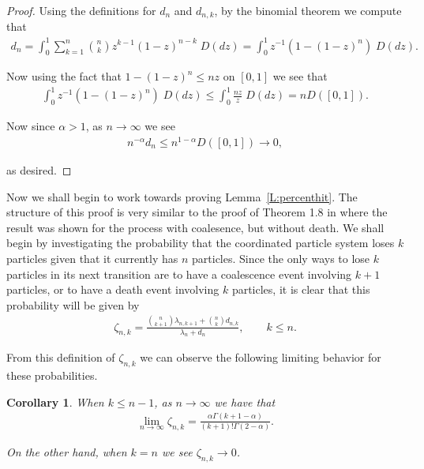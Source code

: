 \documentclass[11pt]{article}
\newtheorem{corollary}[lemma]{Corollary}
\theoremstyle{definition}
\newcommand{\lemref}[1]{Lemma~\ref{L:#1}}
\begin{document}
\begin{proof}
    Using the definitions for $d_n$ and $d_{n,k}$, by the binomial theorem we compute that
    \begin{align*}
        d_n =  \int_{0}^1 \sum_{k = 1}^n \binom{n}{k}z^{k-1}(1-z)^{n-k}\;D(dz) = \int_0^1 z^{-1}(1 - (1-z)^n)\;D(dz).
    \end{align*}

    \noindent Now using the fact that $1 - (1-z)^n \leq nz$ on $[0,1]$ we see that
    \begin{align*}
        \int_0^1 z^{-1}(1 - (1-z)^n)\;D(dz) \leq \int_0^1 \frac{nz}{z}\;D(dz) = nD([0,1]).
    \end{align*}

    \noindent Now since $\alpha > 1$, as $n \to \infty$ we see
    \begin{align*}
        n^{-\alpha}d_n \leq n^{1-\alpha}D([0,1]) \to 0,
    \end{align*}

    \noindent as desired.
\end{proof}

\noindent Now we shall begin to work towards proving \lemref{percenthit}. The structure of this proof is very similar to the proof of Theorem 1.8 in \cite{betasmalltime} where the result was shown for the process with coalesence, but without death. We shall begin by investigating the probability that the coordinated particle system loses $k$ particles given that it currently has $n$ particles. Since the only ways to lose $k$ particles in its next transition are to have a coalescence event involving $k+1$ particles, or to have a death event involving $k$ particles, it is clear that this probability will be given by
%
\begin{align*}
    \zeta_{n,k} = \frac{\binom{n}{k+1} \lambda_{n,k+1} + \binom{n}{k}d_{n,k}}{\lambda_n + d_n}, \qquad k \leq n.
\end{align*}

\noindent From this definition of $\zeta_{n,k}$ we can observe the following limiting behavior for these probabilities.

\begin{corollary}\label{C:convergeindist}
    When $k \leq n-1$, as $n \to \infty$ we have that
    \begin{align*}
        \lim_{n \to \infty} \zeta_{n,k} = \frac{\alpha\Gamma(k + 1 - \alpha)}{(k+1)!\Gamma(2-\alpha)}.
    \end{align*}

    \noindent On the other hand, when $k = n$ we see $\zeta_{n,k} \to 0$.
\end{corollary}
\end{document}
